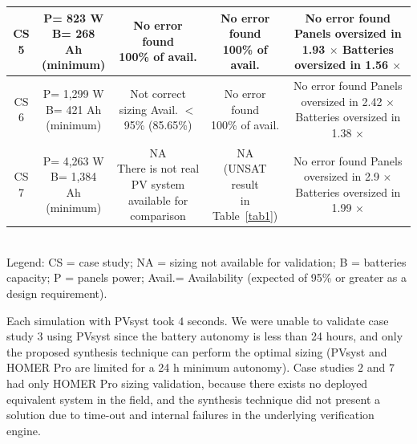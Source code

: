 \documentclass[runningheads]{llncs}
\begin{document}
\begin{table}
\begin{scriptsize}
\begin{tabular}{c|c|c|c|c}
\hline
CS 5 & \makecell{P= 823 W\\B= 268 Ah\\(minimum)} & \makecell{No error found \\100\% of avail.} & \makecell{No error found \\100\% of avail.} & \makecell{No error found\\Panels oversized in 1.93 $\times$\\Batteries oversized in 1.56 $\times$}\\
\hline
CS 6 & \makecell{P= 1,299 W\\B= 421 Ah\\(minimum)} & \makecell{Not correct sizing \\Avail. $<$ 95\%\\(85.65\%)} & \makecell{No error found \\100\% of avail.} & \makecell{No error found\\Panels oversized in 2.42 $\times$\\Batteries oversized in 1.38 $\times$}\\
\hline
CS 7 & \makecell{P= 4,263 W\\B= 1,384 Ah\\(minimum)} & \makecell{NA\\There is not real PV system\\available for comparison} & \makecell{NA \\(UNSAT result\\in Table~\ref{tab1})} & \makecell{No error found\\Panels oversized in 2.9 $\times$\\Batteries oversized in 1.99 $\times$}\\
\hline
\hline
\end{tabular}
\\Legend: CS = case study; NA = sizing not available for validation; B = batteries capacity; P = panels power; Avail.= Availability (expected of 95\% or greater as a design requirement).
\end{scriptsize}
\end{table}

Each simulation with PVsyst took $4$ seconds. We were unable to validate case study $3$ using PVsyst since the battery autonomy is less than 24 hours, and only the proposed synthesis technique can perform the optimal sizing (PVsyst and HOMER Pro are limited for a 24 h minimum autonomy). Case studies $2$ and $7$ had only HOMER Pro sizing validation, because there exists no deployed equivalent system in the field, and the synthesis technique did not present a solution due to time-out and internal failures in the underlying verification engine. %
\end{document}
